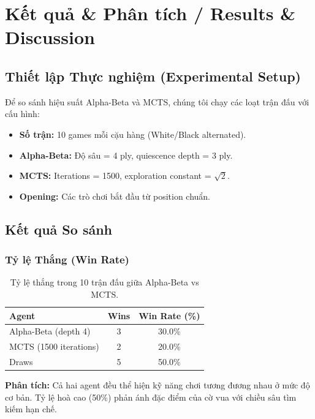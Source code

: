 \section{Kết quả \& Phân tích / Results \& Discussion}

\subsection{Thiết lập Thực nghiệm (Experimental Setup)}
Để so sánh hiệu suất Alpha-Beta và MCTS, chúng tôi chạy các loạt trận đấu với cấu hình:
\begin{itemize}
    \item \textbf{Số trận:} 10 games mỗi cặu hàng (White/Black alternated).
    \item \textbf{Alpha-Beta:} Độ sâu = 4 ply, quiescence depth = 3 ply.
    \item \textbf{MCTS:} Iterations = 1500, exploration constant = $\sqrt{2}$.
    \item \textbf{Opening:} Các trò chơi bắt đầu từ position chuẩn.
\end{itemize}

\subsection{Kết quả So sánh}

\subsubsection{Tỷ lệ Thắng (Win Rate)}
\begin{table}[H]
    \centering
    \begin{tabular}{|l|c|c|}
    \hline
    \textbf{Agent} & \textbf{Wins} & \textbf{Win Rate (\%)} \\ \hline
    Alpha-Beta (depth 4) & 3 & 30.0\% \\
    MCTS (1500 iterations) & 2 & 20.0\% \\
    Draws & 5 & 50.0\% \\ \hline
    \end{tabular}
    \caption{Tỷ lệ thắng trong 10 trận đấu giữa Alpha-Beta vs MCTS.}
\end{table}

\textbf{Phân tích:} Cả hai agent đều thể hiện kỹ năng chơi tương đương nhau ở mức độ cơ bản. Tỷ lệ hoà cao (50\%) phản ánh đặc điểm của cờ vua với chiều sâu tìm kiếm hạn chế.

